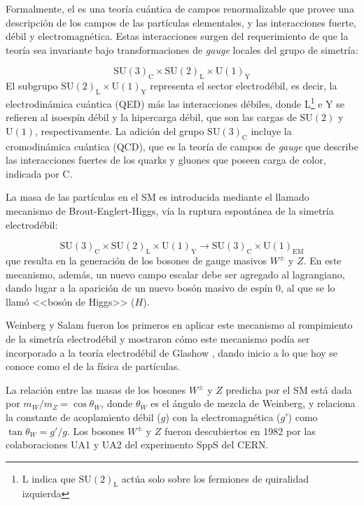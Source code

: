 Formalmente, el {\SM} es una teoría cuántica de campos renormalizable que provee
una descripción de los campos de las partículas elementales, y las interacciones
fuerte, débil y electromagnética. Estas interacciones surgen del requerimiento
de que la teoría sea invariante bajo transformaciones de \emph{gauge} locales del grupo
de simetría:

\begin{equation}
  \text{SU}(3)_\text{C} \times \text{SU}(2)_\text{L} \times \text{U}(1)_\text{Y}
\end{equation}
%
El subgrupo $\text{SU}(2)_\text{L} \times \text{U}(1)_\text{Y}$ representa el sector
electrodébil, es decir, la electrodinámica cuántica (QED) más las interacciones
débiles, donde L\footnote{L indica que $\text{SU}(2)_\text{L}$ actúa solo sobre los
  fermiones de quiralidad izquierda} e Y se refieren al isoespín débil y la
hipercarga débil, que son las cargas de $\text{SU}(2)$ y $\text{U}(1)$,
respectivamente. La adición del grupo $\text{SU}(3)_\text{C}$ incluye la cromodinámica
cuántica (QCD), que es la teoría de campos de \emph{gauge} que describe las
interacciones fuertes de los quarks y gluones que poseen carga de color,
indicada por C.

\setcounter{footnote}{0}

La masa de las partículas en el SM es introducida mediante el llamado mecanismo
de Brout-Englert-Higgs\cite{PhysRevLett.13.321,PhysRevLett.13.508}, vía la
ruptura espontánea de la simetría electrodébil:

\begin{equation}
  \text{SU}(3)_\text{C} \times \text{SU}(2)_\text{L} \times \text{U}(1)_\text{Y} \to \text{SU}(3)_\text{C}
  \times \text{U}(1)_\text{EM}
\end{equation}
%
que resulta en la generación de los bosones de gauge masivos $W^\pm$ y $Z$.
En este mecanismo, además, un nuevo campo escalar debe ser agregado al
lagrangiano, dando lugar a la aparición de un nuevo bosón masivo de espín
0, al que se lo llamó <<bosón de Higgs>> ($H$).

Weinberg y Salam fueron los primeros en aplicar este mecanismo al
rompimiento de la simetría electrodébil
\cite{PhysRevLett.19.1264,PhysRev.127.965} y mostraron cómo este mecanismo podía
ser incorporado a la teoría electrodébil de Glashow \cite{Glashow1961579}, dando
inicio a lo que hoy se conoce como el {\SM} de la física de partículas.

La relación entre las masas de los bosones $W^\pm$ y $Z$ predicha por el SM está
dada por $m_W/m_Z = \cos \theta_W$, donde $\theta_W$ es el ángulo de
mezcla de Weinberg, y relaciona la constante de acoplamiento débil ($g$) con la
electromagnética ($g'$) como $\tan\theta_W = g'/g$. Los bosones $W^\pm$ y $Z$
fueron descubiertos en 1982 por las colaboraciones UA1 y UA2 del experimento
SppS del CERN.

